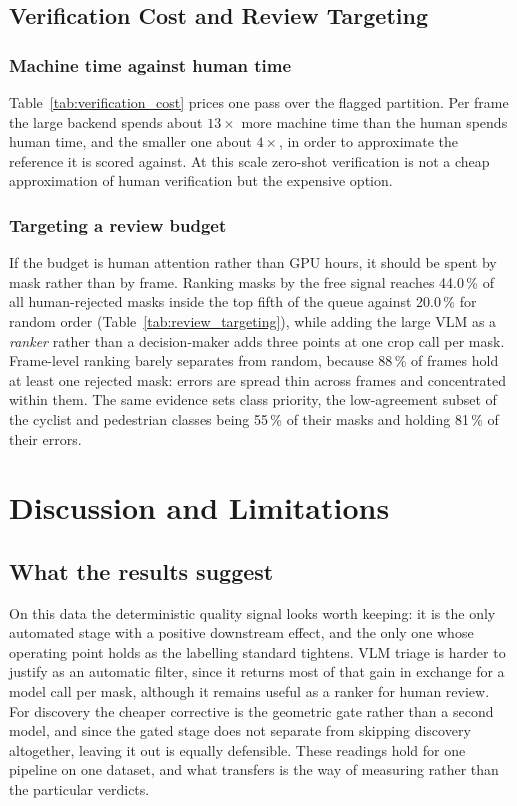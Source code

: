 \documentclass[journal]{IEEEtran}
\begin{document}



\subsection{Verification Cost and Review Targeting}
\label{exp:cost}

\subsubsection{Machine time against human time}
Table~\ref{tab:verification_cost} prices one pass over the flagged partition.
Per frame the large backend spends about $13\times$ more machine time than the human spends human time, and the smaller one about $4\times$, in order to approximate the reference it is scored against.
At this scale zero-shot verification is not a cheap approximation of human verification but the expensive option.

\subsubsection{Targeting a review budget}
If the budget is human attention rather than GPU hours, it should be spent by mask rather than by frame.
Ranking masks by the free signal reaches 44.0\,\% of all human-rejected masks inside the top fifth of the queue against 20.0\,\% for random order (Table~\ref{tab:review_targeting}), while adding the large VLM as a \emph{ranker} rather than a decision-maker adds three points at one crop call per mask.
Frame-level ranking barely separates from random, because 88\,\% of frames hold at least one rejected mask: errors are spread thin across frames and concentrated within them.
The same evidence sets class priority, the low-agreement subset of the cyclist and pedestrian classes being 55\,\% of their masks and holding 81\,\% of their errors.

\section{Discussion and Limitations}

\subsection{What the results suggest}
On this data the deterministic quality signal looks worth keeping: it is the only automated stage with a positive downstream effect, and the only one whose operating point holds as the labelling standard tightens.
VLM triage is harder to justify as an automatic filter, since it returns most of that gain in exchange for a model call per mask, although it remains useful as a ranker for human review.
For discovery the cheaper corrective is the geometric gate rather than a second model, and since the gated stage does not separate from skipping discovery altogether, leaving it out is equally defensible.
These readings hold for one pipeline on one dataset, and what transfers is the way of measuring rather than the particular verdicts.
\end{document}

